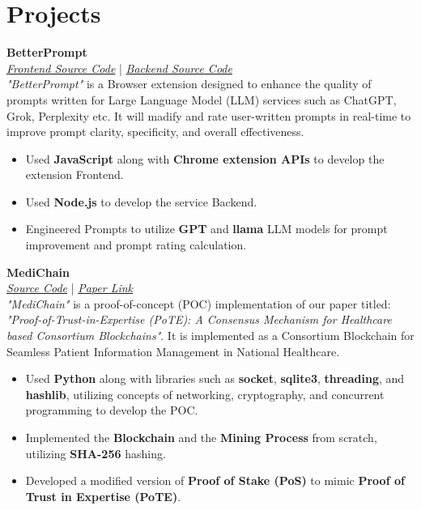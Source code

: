 \documentclass[a4paper,12pt]{article}
\begin{document}
\section*{\faRocket\hspace{0.5em}Projects}
\textbf{BetterPrompt} \\ \textit{\href{https://github.com/BtrPrmt/BetterPrompt-extension}{Frontend Source Code}} | \textit{\href{https://github.com/BtrPrmt/BetterPrompt-WS}{Backend Source Code}} \\
\textit{"BetterPrompt"} is a Browser extension designed to enhance the quality of prompts written for Large Language Model (LLM) services such as ChatGPT, Grok, Perplexity etc. It will madify and rate user-written prompts in real-time to improve prompt clarity, specificity, and overall effectiveness.
\begin{itemize}[leftmargin=1.5em]
    \item Used \textbf{JavaScript} along with \textbf{Chrome extension APIs} to develop the extension Frontend.
    \item Used \textbf{Node.js} to develop the service Backend.
    \item Engineered Prompts to utilize \textbf{GPT} and \textbf{llama} LLM models for prompt improvement and prompt rating calculation.
\end{itemize}
\textbf{MediChain} \\ \textit{\href{https://github.com/karan51ngh/MediChain}{Source Code}} | \textit{\href{https://papers.ssrn.com/sol3/papers.cfm?abstract_id=4804243}{Paper Link}} \\
\textit{"MediChain"} is a proof-of-concept (POC) implementation of our paper titled: \textit{"Proof-of-Trust-in-Expertise (PoTE): A Consensus Mechanism for Healthcare based Consortium Blockchains"}. It is implemented as a Consortium Blockchain for Seamless Patient Information Management in National Healthcare.
\begin{itemize}[leftmargin=1.5em]
    \item Used \textbf{Python} along with libraries such as \textbf{socket}, \textbf{sqlite3}, \textbf{threading}, and \textbf{hashlib}, utilizing concepts of networking, cryptography, and concurrent programming to develop the POC.
    \item Implemented the \textbf{Blockchain} and the \textbf{Mining Process} from scratch, utilizing \textbf{SHA-256} hashing.
    \item Developed a modified version of \textbf{Proof of Stake (PoS)} to mimic \textbf{Proof of Trust in Expertise (PoTE)}.
\end{itemize}
\end{document}
